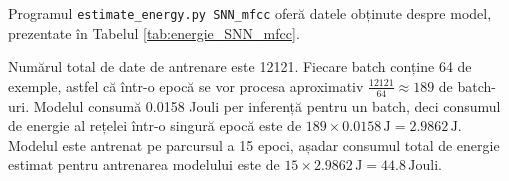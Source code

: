 Programul \texttt{estimate\_energy.py SNN\_mfcc} oferă datele obținute despre model, prezentate în Tabelul \ref{tab:energie_SNN_mfcc}.

Numărul total de date de antrenare este 12121. Fiecare batch conține 64 de exemple, astfel că într-o epocă se vor procesa aproximativ \( \frac{12121}{64} \approx 189 \) de batch-uri. Modelul consumă  0.0158 Jouli per inferență pentru un batch, deci consumul de energie al rețelei într-o singură epocă este de \( 189 \times 0.0158 \, \text{J} = 2.9862 \, \text{J} \). Modelul este antrenat pe parcursul a 15 epoci, așadar consumul total de energie estimat pentru antrenarea modelului este de \( 15 \times 2.9862 \, \text{J} = 44.8 \, \text{Jouli} \).

\begin{table}[htbp]
    \centering
    \caption{Consumul energetic al rețelei spike antrenată coeficienți cepstrali}
    \label{tab:energie_SNN_mfcc}
\end{table}